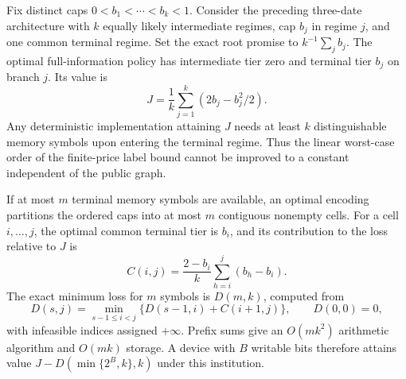 \begin{theorem}\label{thm:memory}
Fix distinct caps $0<b_1<\cdots<b_k<1$. Consider the preceding three-date architecture with $k$ equally likely intermediate regimes, cap $b_j$ in regime $j$, and one common terminal regime. Set the exact root promise to $k^{-1}\sum_jb_j$. The optimal full-information policy has intermediate tier zero and terminal tier $b_j$ on branch $j$. Its value is
\[
 J=\frac1k\sum_{j=1}^k(2b_j-b_j^2/2).
\]
Any deterministic implementation attaining $J$ needs at least $k$ distinguishable memory symbols upon entering the terminal regime. Thus the linear worst-case order of the finite-price label bound cannot be improved to a constant independent of the public graph.

If at most $m$ terminal memory symbols are available, an optimal encoding partitions the ordered caps into at most $m$ contiguous nonempty cells. For a cell $i,\ldots,j$, the optimal common terminal tier is $b_i$, and its contribution to the loss relative to $J$ is
\begin{equation}\label{eq:cell-memory-loss}
 C(i,j)=\frac{2-b_i}{k}\sum_{h=i}^j(b_h-b_i).
\end{equation}
The exact minimum loss for $m$ symbols is $D(m,k)$, computed from
\begin{equation}\label{eq:memory-dp}
 D(s,j)=\min_{s-1\leq i<j}\{D(s-1,i)+C(i+1,j)\},
 \qquad D(0,0)=0,
\end{equation}
with infeasible indices assigned $+\infty$. Prefix sums give an $O(mk^2)$ arithmetic algorithm and $O(mk)$ storage. A device with $B$ writable bits therefore attains value $J-D(\min\{2^B,k\},k)$ under this institution.
\end{theorem}

